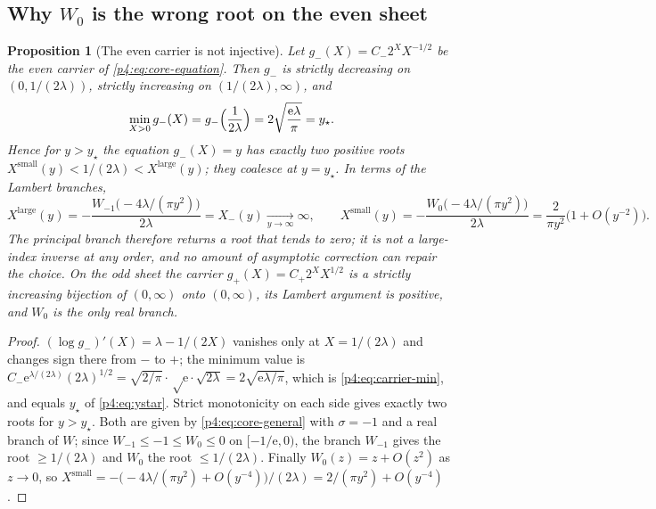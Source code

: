 \documentclass[11pt,a4paper,oneside]{book}
\theoremstyle{plain}
\newtheorem{proposition}[theorem]{Proposition}
\theoremstyle{definition}
\theoremstyle{remark}
\newcommand{\e}{\mathrm{e}}
\newcommand{\Wlam}{W}
\newcommand{\Xcore}{X}
\begin{document}
\subsection{Why $\Wlam_0$ is the wrong root on the even sheet}

\begin{proposition}[The even carrier is not injective]
\label{p4:prop:two-roots}
Let $g_-(\Xcore)=C_-2^{\Xcore}\Xcore^{-1/2}$ be the even carrier of
\cref{p4:eq:core-equation}.  Then $g_-$ is strictly decreasing on
$(0,1/(2\lambda))$, strictly increasing on $(1/(2\lambda),\infty)$, and
\begin{equation}
  \min_{\Xcore>0}g_-(\Xcore)=g_-\Bigl(\frac1{2\lambda}\Bigr)
  =2\sqrt{\frac{\e\lambda}{\pi}}=y_\star .
  \label{p4:eq:carrier-min}
\end{equation}
Hence for $y>y_\star$ the equation $g_-(\Xcore)=y$ has exactly two positive
roots $\Xcore^{\mathrm{small}}(y)<1/(2\lambda)<\Xcore^{\mathrm{large}}(y)$;
they coalesce at $y=y_\star$.  In terms of the Lambert branches,
\begin{equation}
  \Xcore^{\mathrm{large}}(y)
   =-\frac{\Wlam_{-1}\bigl(-4\lambda/(\pi y^{2})\bigr)}{2\lambda}
   =\Xcore_-(y)\xrightarrow[y\to\infty]{}\infty,
  \qquad
  \Xcore^{\mathrm{small}}(y)
   =-\frac{\Wlam_{0}\bigl(-4\lambda/(\pi y^{2})\bigr)}{2\lambda}
   =\frac{2}{\pi y^{2}}\bigl(1+O(y^{-2})\bigr).
  \label{p4:eq:two-roots}
\end{equation}
The principal branch therefore returns a root that \emph{tends to zero}; it is
not a large-index inverse at any order, and no amount of asymptotic correction
can repair the choice.  On the odd sheet the carrier
$g_+(\Xcore)=C_+2^{\Xcore}\Xcore^{1/2}$ is a strictly increasing bijection of
$(0,\infty)$ onto $(0,\infty)$, its Lambert argument is positive, and
$\Wlam_0$ is the only real branch.
\end{proposition}

\begin{proof}
$(\log g_-)'(\Xcore)=\lambda-1/(2\Xcore)$ vanishes only at
$\Xcore=1/(2\lambda)$ and changes sign there from $-$ to $+$; the minimum
value is
$C_-\e^{\lambda/(2\lambda)}(2\lambda)^{1/2}
=\sqrt{2/\pi}\cdot\sqrt\e\cdot\sqrt{2\lambda}=2\sqrt{\e\lambda/\pi}$,
which is \cref{p4:eq:carrier-min}, and equals $y_\star$ of
\cref{p4:eq:ystar}.  Strict monotonicity on each side gives exactly two roots
for $y>y_\star$.  Both are given by \cref{p4:eq:core-general} with $\sigma=-1$
and a real branch of $\Wlam$; since $\Wlam_{-1}\le-1\le\Wlam_0\le0$ on
$[-1/\e,0)$, the branch $\Wlam_{-1}$ gives the root
$\ge1/(2\lambda)$ and $\Wlam_0$ the root $\le1/(2\lambda)$.  Finally
$\Wlam_0(z)=z+O(z^{2})$ as $z\to0$, so
$\Xcore^{\mathrm{small}}=-\bigl(-4\lambda/(\pi y^2)+O(y^{-4})\bigr)/(2\lambda)
=2/(\pi y^{2})+O(y^{-4})$.
\end{proof}
\end{document}
